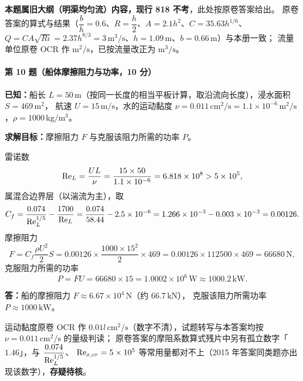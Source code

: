 \begin{tishi}
\textbf{本题属旧大纲（明渠均匀流）内容，现行 818 不考}，此处按原卷答案给出。
原卷答案的算式与结果（$\dfrac bh=0.6$、$R=\dfrac h2$、$A=2.1h^{2}$、$C=35.63h^{1/6}$、
$Q=CA\sqrt{Ri}=2.37h^{8/3}=3\,\mathrm{m^3/s}$、$h=1.09\,\mathrm{m}$、$b=0.66\,\mathrm{m}$）与本册一致；
流量单位原卷 OCR 作 $\mathrm{m^2/s}$，已按流量改正为 $\mathrm{m^3/s}$。
\end{tishi}

\paragraph{第 10 题（船体摩擦阻力与功率，10 分）}
\begin{jie}
\textbf{已知：}船长 $L=50\,\mathrm{m}$（按同一长度的相当平板计算，取沿流向长度），浸水面积 $S=469\,\mathrm{m^2}$，
航速 $U=15\,\mathrm{m/s}$，水的运动黏度 $\nu=0.011\,\mathrm{cm^2/s}=1.1\times10^{-6}\,\mathrm{m^2/s}$，$\rho=1000\,\mathrm{kg/m^3}$。

\textbf{求解目标：}摩擦阻力 $F$ 与克服该阻力所需的功率 $P$。

雷诺数
\[
\mathrm{Re}_L=\frac{UL}{\nu}=\frac{15\times50}{1.1\times10^{-6}}=6.818\times10^{8}>5\times10^{5},
\]
属混合边界层（以湍流为主），取
\[
C_f=\frac{0.074}{\mathrm{Re}_L^{1/5}}-\frac{1700}{\mathrm{Re}_L}
=\frac{0.074}{58.44}-2.5\times10^{-6}
=1.266\times10^{-3}-0.003\times10^{-3}=0.00126 .
\]
摩擦阻力
\[
F=C_f\frac{\rho U^{2}}{2}S
=0.00126\times\frac{1000\times15^{2}}{2}\times469
=0.00126\times112500\times469=66680\,\mathrm{N},
\]
克服阻力所需的功率
\[
P=FU=66680\times15=1.0002\times10^{6}\,\mathrm{W}\approx1000.2\,\mathrm{kW}.
\]

\textbf{答：}船的摩擦阻力 $F\approx6.67\times10^{4}\,\mathrm{N}$（约 $66.7\,\mathrm{kN}$），
克服该阻力所需功率 $P\approx1000\,\mathrm{kW}$。
\end{jie}

\begin{tishi}
运动黏度原卷 OCR 作 $0.01l\,\mathrm{cm^2/s}$（数字不清），试题转写与本答案均按 $\nu=0.011\,\mathrm{cm^2/s}$ 的量级判读；
原卷答案的摩阻系数算式残片中另有孤立数字「$1.46$」，与 $\dfrac{0.074}{\mathrm{Re}_L^{1/5}}$、
$\mathrm{Re}_{x,cr}=5\times10^{5}$ 等常用量都对不上（2015 年答案同类题亦出现该数字），\textbf{存疑待核}。
\end{tishi}


